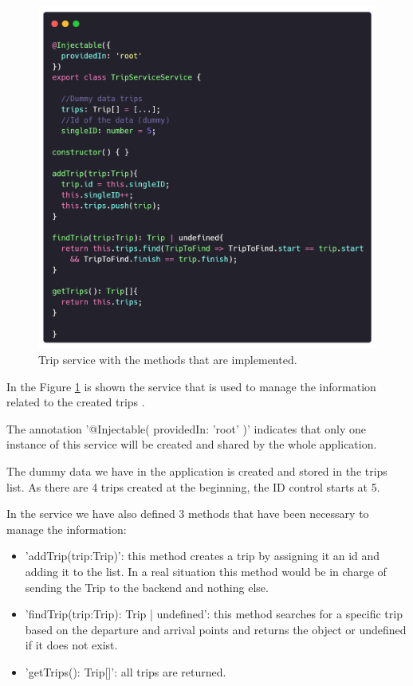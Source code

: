 \documentclass{article}
\begin{document}
    \begin{figure}[h]
      \centering
      \includegraphics[width=1\columnwidth]{figures/TripService.service.ts.png}
      \caption{Trip service with the methods that are implemented.\label{fig:TripService.service.ts.png}}
      \end{figure}

    In the Figure \ref{fig:TripService.service.ts.png} is shown the service that is used to manage the information related to the created trips \cite{caridaCode}. 

    The annotation '@Injectable({ providedIn: 'root' })' indicates that only one instance of this service will be created and shared by the whole application.

    The dummy data we have in the application is created and stored in the trips list. As there are 4 trips created at the beginning, the ID control starts at 5.

    In the service we have also defined 3 methods that have been necessary to manage the information:

    \begin{itemize}
      \item 'addTrip(trip:Trip)': this method creates a trip by assigning it an id and adding it to the list. In a real situation this method would be in charge of sending the Trip to the backend and nothing else.
      \item 'findTrip(trip:Trip): Trip | undefined': this method searches for a specific trip based on the departure and arrival points and returns the object or undefined if it does not exist.
      \item 'getTrips(): Trip[]': all trips are returned.
    \end{itemize}
\end{document}
